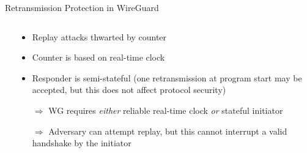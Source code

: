 
\begin{frame}{Retransmission Protection in WireGuard}
  \small
  \begin{columns}[fullwidth,T]
    \begin{column}{.5\linewidth}
      \vspace{-.05\textheight}
    \end{column}%
    \begin{column}{.46\linewidth}
      \small
      \begin{itemize}
        \item Replay attacks thwarted by counter
        \item Counter is based on real-time clock
        \item Responder is semi-stateful (one retransmission at program start may be accepted, but this does not affect protocol security)
        \item[$\Rightarrow$]
          WG requires \emph{either} reliable real-time clock \emph{or} stateful initiator
        \item[$\Rightarrow$]
          Adversary can attempt replay, but this cannot interrupt a valid handshake by the initiator
      \end{itemize}
    \end{column}
  \end{columns}
\end{frame}

